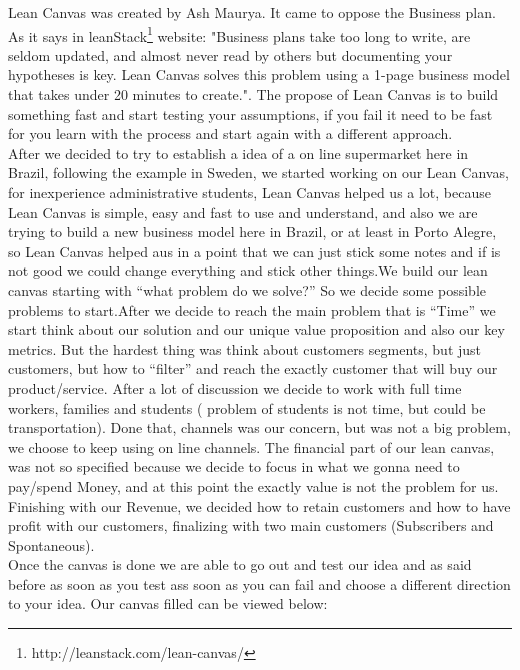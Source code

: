 \documentclass[12pt]{article}
\begin{document}
Lean Canvas was created by Ash Maurya. It came to oppose the Business plan. As it says in leanStack\footnote{http://leanstack.com/lean-canvas/} website: "Business plans take too long to write, are seldom updated, and almost never read by others but documenting your hypotheses is key. Lean Canvas solves this problem using a 1-page business model that takes under 20 minutes to create.". The propose of Lean Canvas is to build something fast and start testing your assumptions, if you fail it need to be fast for you learn with the process and start again with a different approach. \\
After we decided to try to establish a idea of a on line supermarket here in 
Brazil, following the example in Sweden, we started working on our Lean 
Canvas, for inexperience administrative students, Lean Canvas helped us a
lot, because Lean Canvas is simple, easy and fast to use and understand, 
and also we are trying to build a new business model here in Brazil, or at least in Porto Alegre, so Lean Canvas helped aus in a point that we can just stick some notes and if is not good we could change everything  and stick other things.We build our lean canvas starting with “what problem do we solve?” So we decide some possible problems to start.After we decide to reach the main problem that is “Time” we start think about our solution and our unique value proposition and also our key metrics. But the hardest thing was think about customers segments, but just customers, but how to “filter” and reach the exactly customer that will buy our product/service. After a lot of discussion we decide to work with full time workers, families and students ( problem of students is not time, but could be transportation). Done that, channels was our concern, but was not a big problem, we choose to keep using on line channels. The financial part of our lean canvas, was not so specified because we decide to focus in what we gonna need to pay/spend Money, and at this point the exactly value is not the problem for us. Finishing with our Revenue, we decided how to retain customers and how to have profit with our customers, finalizing with two main customers 
(Subscribers and Spontaneous).\\
Once the canvas is done we are able to go out and test our idea and as said before as soon as you test ass soon as you can fail and choose a different direction to your idea. Our canvas filled can be viewed below: 
\end{document}

